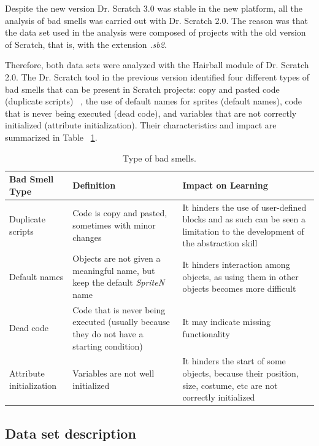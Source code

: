 Despite the new version Dr. Scratch 3.0 was stable in the new platform, all the analysis of bad smells was carried out with Dr. Scratch 2.0. The reason was that the data set used in the analysis were composed of projects with the old version of Scratch, that is, with the extension \textit{.sb2}.

Therefore, both data sets were analyzed with the Hairball module of Dr. Scratch 2.0. The Dr. Scratch tool in the previous version identified four different types of bad smells that can be present in Scratch projects: copy and pasted code (duplicate scripts) ~\cite{robles2017software}, the use of default names for sprites (default names), code that is never being executed (dead code), and variables that are not correctly initialized (attribute initialization). Their characteristics and impact are summarized in Table ~\ref{table:bad_smells}.

\begin{table}
 \begin{center}
  \begin{tabular}{ |p{4cm}|p{5cm}|p{5cm}|}
    \hline
    Bad Smell Type & Definition & Impact on Learning \\ \hline
    Duplicate scripts & Code is copy and pasted, sometimes with minor changes & It hinders the use of user-defined blocks and as such can be seen a limitation to the development of the abstraction skill \\ \hline
    Default names & Objects are not given a meaningful name, but keep the default {\em SpriteN} name & It hinders interaction among objects, as using them in other objects becomes more difficult \\ \hline
    Dead code & Code that is never being executed (usually because they do not have a starting condition) & It may indicate missing functionality \\ \hline
    Attribute initialization & Variables are not well initialized & It hinders the start of some objects, because their position, size, costume, etc are not correctly initialized \\ \hline
  \end{tabular}
  \caption{Type of bad smells.}
  \label{table:bad_smells}
 \end{center}
\end{table}

\subsection{Data set description}
\label{subsec:descrip_dataset}

